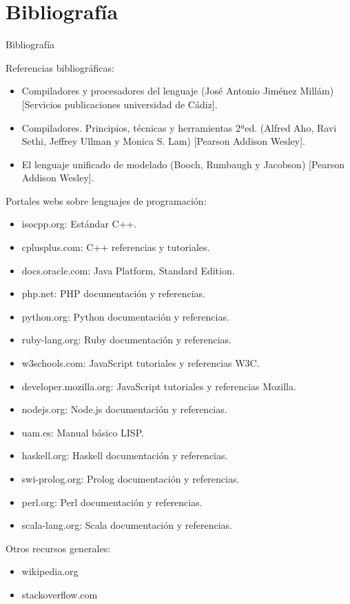 \documentclass[spanish]{beamer}
\begin{document}
\section{Bibliografía}
\begin{frame}{Bibliografía}
   \tiny{
   Referencias bibliográficas:
\begin{itemize}
\item Compiladores y procesadores del lenguaje (José Antonio Jiménez Millám) [Servicios publicaciones universidad de Cádiz].
\item Compiladores. Principios, técnicas y herramientas 2ªed. (Alfred Aho, Ravi Sethi, Jeffrey Ullman y Monica S. Lam) [Pearson Addison Wesley].
\item El lenguaje unificado de modelado (Booch, Rumbaugh y Jacobson) [Pearson Addison Wesley].
\end{itemize}

Portales webs sobre lenguajes de programación:
\begin{itemize}
\item isocpp.org: Estándar C++.
\item cplusplus.com: C++ referencias y tutoriales.
\item docs.oracle.com: Java Platform, Standard Edition.
\item php.net: PHP documentación y referencias.
\item python.org: Python documentación y referencias.
\item ruby-lang.org: Ruby documentación y referencias.
\item w3schools.com: JavaScript tutoriales y referencias W3C.
\item developer.mozilla.org: JavaScript tutoriales y referencias Mozilla.
\item nodejs.org: Node.js documentación y referencias.
\item uam.es: Manual básico LISP.
\item haskell.org: Haskell documentación y referencias.
\item swi-prolog.org: Prolog documentación y referencias.
\item perl.org: Perl documentación y referencias.
\item scala-lang.org: Scala documentación y referencias.
\end{itemize}
\pagebreak
Otros recursos generales:
\begin{itemize}
\item wikipedia.org
\item stackoverflow.com
\end{itemize}
   }
\end{frame}
\end{document}
